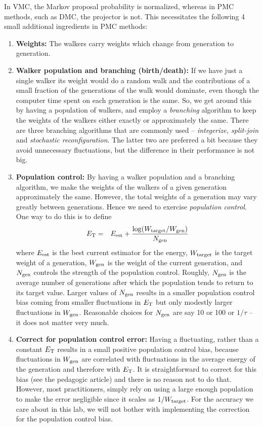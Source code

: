 \documentclass[11pt,aps,prb,amsmath,amssymb,superscriptaddress,notitlepage]{revtex4-1}
\def\beq{\begin{eqnarray}}
\def\eeq{\end{eqnarray}}
\begin{document}
In VMC, the Markov proposal probability is normalized, whereas in PMC methods, such as DMC, the projector is not.
This necessitates the following 4 small additional ingredients in PMC methods:
\begin{enumerate}
\item {\bf Weights:} The walkers carry weights which change from generation to generation.

\item {\bf Walker population and branching (birth/death):} If we have just a single walker its weight
would do a random walk and the contributions of a small fraction of the generations of the walk would dominate, even though the
computer time spent on each generation is the same.  So, we get around this by having a population
of walkers, and employ a {\it branching} algorithm to keep the weights of the walkers either exactly or approximately
the same.  There are three branching algorithms that are commonly used -- {\it integerize, split-join}
and {\it stochastic reconfiguration}.  The latter two are preferred a bit because they avoid unnecessary
fluctuations, but the difference in their performance is not big.

\item {\bf Population control:} By having a walker population and a branching algorithm, we make the weights
of the walkers of a given generation approximately the same.  However, the total weights of a generation may
vary greatly between generations.  Hence we need to exercise {\it population control}.
One way to do this is to define
\beq
\ET &=& \Eest + {\log(W_{\rm target}/W_{\rm gen}) \over N_{\rm gen}}
\label{popcontrol}
\eeq
where $E_{\rm est}$ is the best current estimator for the energy, $W_{\rm target}$ is the target weight of a generation,
$W_{\rm gen}$ is the weight of the current generation, and $N_{\rm gen}$ controls the strength of the population
control.  Roughly, $N_{\rm gen}$ is the average number of generations after which the population tends to
return to its target value.
Larger values of $N_{\rm gen}$ results in a smaller population control bias coming from smaller fluctuations in $E_{\rm T}$ but only modestly larger fluctuations in $W_{\rm gen}$.
Reasonable choices for $N_{\rm gen}$ are say 10 or 100 or $1/\tau$ -- it does not matter very much. 

\item {\bf Correct for population control error:}  Having a fluctuating, rather than a constant $E_{\rm T}$ results
in a small positive population control bias, because fluctuations in $W_{\rm gen}$ are correlated with fluctuations
in the average energy of the generation and therefore with $E_{\rm T}$.  It is straightforward to correct for this bias (see the pedagogic article)
and there is no reason not to do that.
However, most practitioners, simply rely on using a large enough population to make the error negligible
since it scales as $1/W_{\rm target}$.  For the accuracy we care about in this lab, we will not bother with
implementing the correction for the population control bias.
\end{enumerate}
\end{document}
